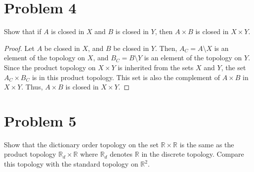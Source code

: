 \documentclass[11pt]{article}
\begin{document}
\section{Problem 4}
\label{sec:org8c337ce}

Show that if \(A\) is closed in \(X\) and \(B\) is closed in \(Y\), then
\(A\times B\) is closed in \(X\times Y\).

\begin{proof}


Let \(A\) be closed in \(X\), and \(B\) be closed in \(Y\). Then, \(A_C =
A\setminus X\) is an element of the topology on \(X\), and \(B_C =
B\setminus Y\) is an element of the topology on \(Y\). Since the product
topology on \(X\times Y\) is inherited from the sets \(X\) and \(Y\), the
set \(A_C \times B_C\) is in this product topology. This set is also the
complement of \(A \times B\) in \(X\times Y\). Thus, \(A\times B\) is closed
in \(X\times Y\).
\end{proof}

\section{Problem 5}
\label{sec:org707405d}

Show that the dictionary order topology on the set
\(\mathbb{R}\times\mathbb{R}\) is the same as the product topology
\(\mathbb{R}_d\times\mathbb{R}\) where \(\mathbb{R}_d\) denotes
\(\mathbb{R}\) in the discrete topology. Compare this topology with the
standard topology on \(\mathbb{R}^2\).
\end{document}
